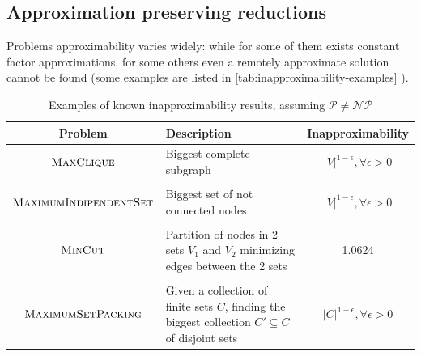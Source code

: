 \subsection{Approximation preserving reductions}%
\label{sub:approximation_preserving_reductions}

Problems approximability varies widely: while for some of them exists
constant factor approximations, for some others even a remotely approximate
solution cannot be found \cite{Ausiello2005} (some examples are listed in
\autoref{tab:inapproximability-examples} ).

\begin{table}
	\centering
	\caption[Examples of inapproximability]{Examples of known inapproximability results, assuming $\mathcal{P}
			\neq \mathcal{NP} $ \cite{10.1007/3-540-63248-4_10} }
	\label{tab:inapproximability-examples}
	\begin{tabular}{c|p{5cm}|c}
		Problem                                                          & Description                                                   & Inapproximability \\
		\hline
		$ \textsc{MaxClique} $                                           & Biggest complete subgraph                                     & $|V|^{1-
		\epsilon}, \forall \epsilon > 0 $                                                                                                                    \\
		                                                                 &                                                               &                   \\
		$ \textsc{MaximumIndipendentSet} $                               &
		Biggest set of not connected nodes                               & $|V|^{1-
		\epsilon}, \forall \epsilon > 0 $                                                                                                                    \\
		                                                                 &                                                               &                   \\
		$ \textsc{MinCut} $                                              & Partition of nodes in 2 sets $V_1$ and $V_2$ minimizing edges
		between the 2 sets                                               & 1.0624                                                                            \\
		                                                                 &                                                               &                   \\
		$ \textsc{MaximumSetPacking} $                                   & Given a collection of
		finite sets $C$,
		finding the biggest collection $C' \subseteq C$ of disjoint sets & $|C|^{1-
		\epsilon}, \forall \epsilon > 0 $                                                                                                                    \\
	\end{tabular}
\end{table}

